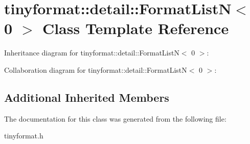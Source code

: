 \hypertarget{classtinyformat_1_1detail_1_1FormatListN_3_010_01_4}{}\section{tinyformat\+:\+:detail\+:\+:Format\+ListN$<$ 0 $>$ Class Template Reference}
\label{classtinyformat_1_1detail_1_1FormatListN_3_010_01_4}


Inheritance diagram for tinyformat\+:\+:detail\+:\+:Format\+ListN$<$ 0 $>$\+:


Collaboration diagram for tinyformat\+:\+:detail\+:\+:Format\+ListN$<$ 0 $>$\+:
\subsection*{Additional Inherited Members}


The documentation for this class was generated from the following file\+:\begin{DoxyCompactItemize}
\item 
tinyformat.\+h\end{DoxyCompactItemize}
